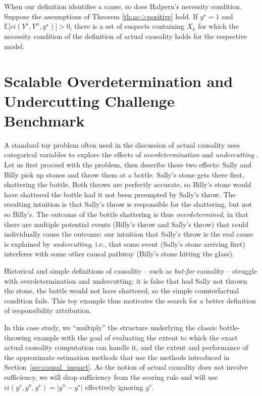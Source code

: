 \documentclass[anon,12pt]{clear2026} %
\begin{document}
\begin{theorem}[Informal]\label{th:ci_halpern} When our definition identifies a cause, so does Halpern's necessity condition. Suppose the assumptions of Theorem \ref{th:ac->positive} hold. If $y^\star = 1$ and $\mathbb{E}\big[ci(Y^s, Y^n, y^\star) \big] >0$, there is a set of suspects containing $X_k$ for which the necessity condition of the definition of actual causality holds for the respective model.
\end{theorem}




\section{Scalable Overdetermination and Undercutting Challenge Benchmark}\label{sec:ac_benchmark}

A standard toy problem often used in the discussion of actual causality uses categorical variables to explore the effects of \emph{overdetermination} and \emph{undercutting} \citep{actualCausalityHalpern}. Let us first proceed with the problem, then describe these two effects: Sally and Billy pick up stones and throw them at a bottle. 
Sally’s stone gets there first, shattering the bottle. 
Both throws are perfectly accurate, so Billy’s stone would have shattered the bottle had it not been preempted by Sally’s throw. The resulting intuition is that Sally's throw is responsible for the shattering, but not so Billy's. The outcome of the bottle shattering is thus \emph{overdetermined}, in that there are multiple potential events (Billy's throw and Sally's throw) that could individually cause the outcome; our intuition that Sally's throw is the real cause is explained by \emph{undercutting}, i.e., that some event (Sally's stone arriving first) interferes with some other causal pathway (Billy's stone hitting the glass).

Historical and simple definitions of causality -- such as \emph{but-for} causality -- struggle with overdetermination and undercutting: it is false that had Sally not thrown the stone, the bottle would not have shattered, so the simple counterfactual condition fails. This toy example thus motivates the search for a better definition of responsibility attribution. 

In this case study, we ``multiply'' the structure underlying the classic bottle-throwing example with the goal of evaluating the extent to which the exact actual causality computation can handle it, and the extent and performance of the approximate estimation methods that use the methods introduced in Section~\ref{sec:causal_impact}. 
As the notion of actual causality does not involve sufficiency, we will drop sufficiency from the scoring rule and will use $ci(y^s, y^n, y^{\star}) = \vert y^n - y^\star\vert$ effectively ignoring $y^s$.
\end{document}
